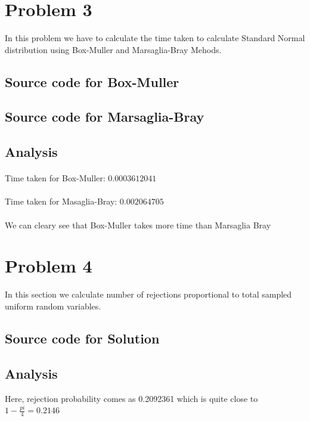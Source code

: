 \documentclass{article}
\begin{document}
		\clearpage
		
		\section{Problem 3}
			In this problem we have to calculate the time taken to calculate Standard Normal distribution using Box-Muller and Marsaglia-Bray Mehods.
			
		\subsection{Source code for Box-Muller}
			
	
		\subsection{Source code for Marsaglia-Bray}
		


		\subsection{Analysis}
			\paragraph{}
			Time taken for Box-Muller:  $0.0003612041 $
			
			\paragraph{}			
			Time taken for Masaglia-Bray:  $0.002064705$
		
			\paragraph{}
				We can cleary see that Box-Muller takes more time than Marsaglia Bray		
		\section{Problem 4}
			In this section we calculate number of rejections proportional to total sampled uniform random variables.
			
			\subsection{Source code for Solution}
				
		
		\subsection{Analysis}
			Here, rejection probability comes as 0.2092361 which is quite close to $1- \frac{pi}{4} =0.2146$
			
		
		

		
\end{document}

